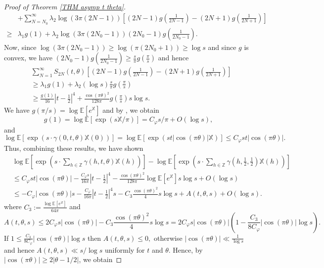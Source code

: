 \documentclass[12pt]{amsart}
\theoremstyle{definition}
\numberwithin{equation}{section}
\numberwithin{equation}{section}
\def\E{\mathbb{E}}
\def\Z{\mathbb{Z}}
\def\Mp{C_\varphi}
\def\X{\mathbb{X}}
\def\E{\mathbb{E}}
\begin{document}
\begin{proof}[Proof of Theorem \ref{THM asymp t theta}]
\begin{align*}
&+\sum_{N = N_0}^{\infty}  \lambda_2 \log(3\pi(2N-1))\left[
(2N-1)g\left(\frac{1}{2N-1}\right)
-(2N+1)g\left(\frac{1}{2N+1}\right)\right]\\
\geq & \lambda_1 g(1)+\lambda_2 \log(3\pi(2N_0-1))
(2N_0-1)g\left(\frac{1}{2N_0-1}\right).
\end{align*}
Now, since $\log(3\pi(2N_0-1))\geq \log(\pi(2N_0+1)) \geq \log s$ and since $g$ is convex, we have
$(2N_0-1)g\left(\frac{1}{2N_0-1}\right)\geq \frac{s}{\pi} g\left(\frac{\pi }{s}\right) $ and hence
\begin{align*}
&\sum_{N = 1}^{\infty} S_{2N}(t,\theta) \left[
(2N-1)g\left(\frac{1}{2N-1}\right)
-(2N+1)g\left(\frac{1}{2N+1}\right)\right]\\
&\geq  \lambda_1 g(1)+\lambda_2(\log s) \frac{s}{\pi} g\left(\frac{\pi}{s}\right)\\
&\geq \frac{g(1)}{16}\left|t-\frac{1}{2}\right|^4+
\frac{\cos(\pi\theta)^2}{128 \pi }g\left(\frac{\pi}{s}\right) s\log s 
    .
\end{align*}
We have $g(\pi/s)  = \log\E\left[e^\X\right]$ and by \cite[Lemma 5.3]{ABL21}, we obtain $$g(1)=\log\E\left[\exp\left(s \X/\pi\right)\right] = \Mp s/\pi+O(\log s),$$ and
\[
\log \E \left[\exp \left(s \cdot  \gamma(0,t,\theta)\X(0)\right) \right] =\log\E\left[\exp\left(s t|\cos(\pi\theta)|\X\right)\right] \leq \Mp st|\cos(\pi\theta)|.
\]
Thus, combining these results, we have shown
\begin{align*}
&\log \E \left[\exp \left(s \cdot \sum_{h\in \Z} \gamma(h,t,\theta)\X(h)\right) \right] 
    -  \log \E \left[\exp \left(s \cdot \sum_{h\in \Z} \gamma\left(h,\frac{1}{2},\frac{1}{2}\right)\X(h)\right)\right]\\
    &\leq \Mp st|\cos(\pi\theta)| - \frac{\Mp s}{16 \pi }\left|t-\frac{1}{2}\right|^4 
    - \frac{\cos(\pi\theta)^2}{128 \pi }\log\E\left[e^\X\right] s\log s +O(\log s) \\
    &\leq -\Mp |\cos(\pi\theta)|s
     -\frac{\Mp }{16 \pi}\left|t-\frac{1}{2}\right|^4 s -C_3 \frac{\cos(\pi\theta)^2}{4}s\log s
     + A(t,\theta,s)+O\left(\log s\right).
\end{align*} 
where $C_3 := \frac{\log\E\left[e^\X\right]}{64\pi}$ and
\[
A(t,\theta,s) \leq  2\Mp s|\cos(\pi\theta )|
-C_3\frac{\cos(\pi\theta)^2}{4}s\log s
= 
 2\Mp s|\cos(\pi\theta )|
 \left(1-\frac{C_3}{8\Mp}|\cos(\pi\theta )|\log s\right). 
\]
If $1\leq \frac{C_3}{8\Mp}|\cos(\pi\theta)|\log s $ then $A(t,\theta,s)\leq 0,$
otherwise $|\cos(\pi \theta)|\ll \frac{1}{\log s} $ and hence $A(t,\theta,s)\ll s/\log s$ uniformly for $t$ and $\theta$. Hence, by  $|\cos(\pi\theta)| \geq 2|\theta-1/2|$, we obtain

\end{proof}
\end{document}
